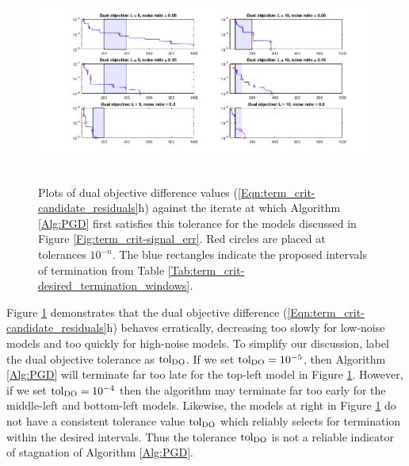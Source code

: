 \begin{figure}[H]
\centering
\hbox{\hspace{-1.5cm} \includegraphics[scale=0.6]{term_crit-dual_obj} }\vspace{-0.4cm}
\caption{Plots of dual objective difference values (\ref{Eqn:term_crit-candidate_residuals}h) against the iterate at which Algorithm \ref{Alg:PGD} first satisfies this tolerance for the models discussed in Figure \ref{Fig:term_crit-signal_err}.  Red circles are placed at tolerances $10^{-n}$.  The blue rectangles indicate the proposed intervals of termination from Table \ref{Tab:term_crit-desired_termination_windows}.}
\label{Fig:term_crit-dual_obj}
\end{figure}


Figure \ref{Fig:term_crit-dual_obj} demonstrates that the dual objective difference (\ref{Eqn:term_crit-candidate_residuals}h) behaves erratically, decreasing too slowly for low-noise models and too quickly for high-noise models.  To simplify our discussion, label the dual objective tolerance as $\textnormal{tol}_\text{DO}$.  If we set $\textnormal{tol}_\text{DO} = 10^{-5}$, then Algorithm \ref{Alg:PGD} will terminate far too late for the top-left model in Figure \ref{Fig:term_crit-dual_obj}.  However, if we set $\textnormal{tol}_\text{DO} = 10^{-4}$ then the algorithm may terminate far too early for the middle-left and bottom-left models.  Likewise, the models at right in Figure \ref{Fig:term_crit-dual_obj} do not have a consistent tolerance value $\textnormal{tol}_\text{DO}$ which reliably selects for termination within the desired intervals.  Thus the tolerance $\textnormal{tol}_\text{DO}$ is not a reliable indicator of stagnation of Algorithm \ref{Alg:PGD}.  



